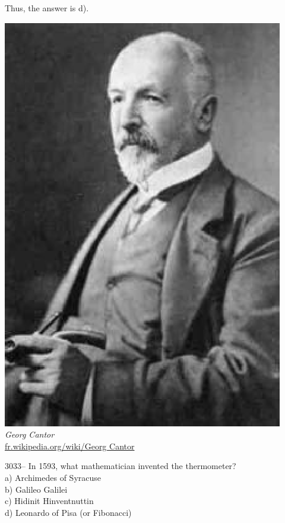 \documentclass[letterpaper, 12pt]{article}
\begin{document}
Thus, the answer is d).
\begin{center}
\includegraphics[scale=0.5]{Georg_Cantor.eps}\\
\emph{{\small Georg Cantor}}\\
\href{http://fr.wikipedia.org/wiki/Georg Cantor}{fr.wikipedia.org/wiki/Georg Cantor}\\[5mm]
\end{center}



3033-- In 1593, what mathematician invented the thermometer?\\

a) Archimedes of Syracuse\\
b) Galileo Galilei\\
c) Hidinit Hinventnuttin\\
d) Leonardo of Pisa (or Fibonacci)\\
\end{document}
